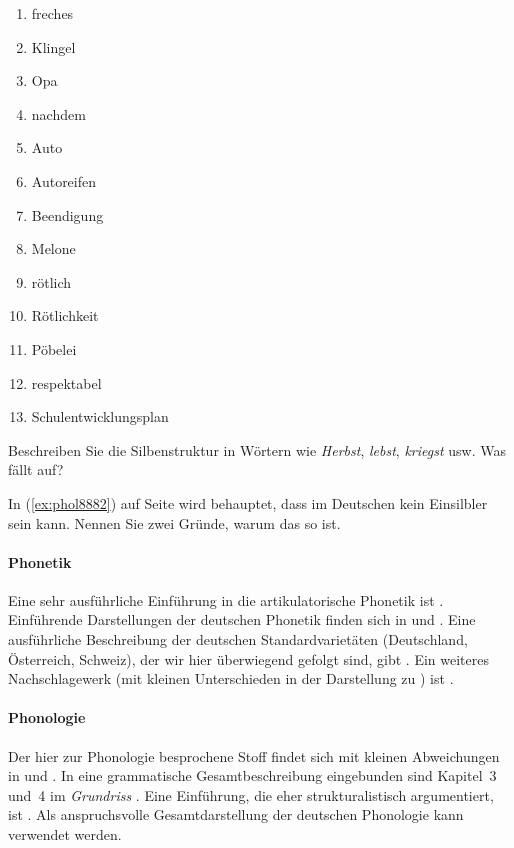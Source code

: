 \begin{enumerate}\Lf
  \item freches
  \item Klingel
  \item Opa
  \item nachdem
  \item Auto
  \item Autoreifen
  \item Beendigung
  \item Melone
  \item rötlich
  \item Rötlichkeit
  \item Pöbelei
  \item respektabel
  \item Schulentwicklungsplan
\end{enumerate}

\Uebung[\tristar] \label{u46} Beschreiben Sie die Silbenstruktur in Wörtern wie \textit{Herbst}, \textit{lebst}, \textit{kriegst} usw.
Was fällt auf?

\Uebung[\tristar] \label{u47} In (\ref{ex:phol8882}) auf Seite \pageref{ex:phol8882} wird behauptet, dass \textipa{[s5]} im Deutschen kein Einsilbler sein kann.
Nennen Sie zwei Gründe, warum das so ist.

\WeitereLiteratur

\paragraph*{Phonetik}

Eine sehr ausführliche Einführung in die artikulatorische Phonetik ist \citet{Laver94}.
Einführende Darstellungen der deutschen Phonetik finden sich \zB in \citet{RRKWS09} und \citet{Wiese10}.
Eine ausführliche Beschreibung der deutschen Standardvarietäten (Deutschland, Österreich, Schweiz), der wir hier überwiegend gefolgt sind, gibt \citet{Krech-ea2009}.
Ein weiteres Nachschlagewerk (mit kleinen Unterschieden in der Darstellung zu \citealp{Krech-ea2009}) ist \citet{Mangold06}.

\paragraph*{Phonologie}

Der hier zur Phonologie besprochene Stoff findet sich mit kleinen Abweichungen \zB in \citet{Hall00} und \citet{Wiese10}.
In eine grammatische Gesamtbeschreibung eingebunden sind Kapitel~3 und~4 im \textit{Grundriss} \citep{Eisenberg1}.
Eine Einführung, die eher strukturalistisch argumentiert, ist \citet{Ternes2012}.
Als anspruchsvolle Gesamtdarstellung der deutschen Phonologie kann \citet{Wiese00} verwendet werden.
